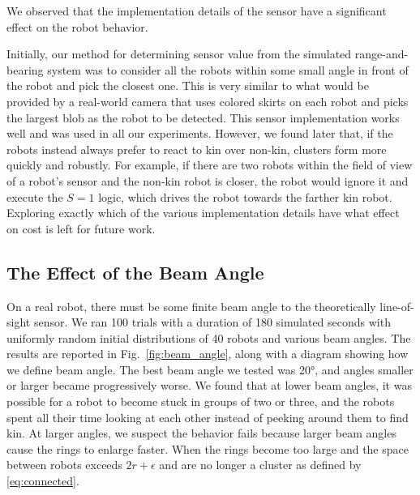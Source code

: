 \documentclass[letterpaper, 10 pt, conference]{ieeeconf}
\begin{document}
We observed that the implementation details of the sensor have a significant
effect on the robot behavior.

Initially, our method for determining sensor value from the simulated
range-and-bearing system was to consider all the robots within some small angle
in front of the robot and pick the closest one. This is very similar to what
would be provided by a real-world camera that uses colored skirts on each robot
and picks the largest blob as the robot to be detected. This sensor
implementation works well and was used in all our experiments. However, we found
later that, if the robots instead always prefer to react to kin over non-kin,
clusters form more quickly and robustly. For example, if there are two robots
within the field of view of a robot's sensor and the non-kin robot is closer,
the robot would ignore it and execute the $S=1$ logic, which drives the robot
towards the farther kin robot. Exploring exactly which of the various
implementation details have what effect on cost is left for future work.

\subsection{The Effect of the Beam Angle} \label{sec:aperture_angle}

On a real robot, there must be some finite beam angle to the theoretically
line-of-sight sensor. We ran 100 trials with a duration of 180 simulated seconds
with uniformly random initial distributions of 40 robots and various beam
angles. The results are reported in Fig.~\ref{fig:beam_angle}, along with a
diagram showing how we define beam angle. The best beam angle we tested was
\ang{20}, and angles smaller or larger became progressively worse. We found that
at lower beam angles, it was possible for a robot to become stuck in groups of
two or three, and the robots spent all their time looking at each other instead
of peeking around them to find kin. At larger angles, we suspect the behavior
fails because larger beam angles cause the rings to enlarge faster. When the
rings become
too large and the space between robots exceeds $2r+\epsilon$
and are no longer a cluster as defined by \eqref{eq:connected}.
\end{document}
